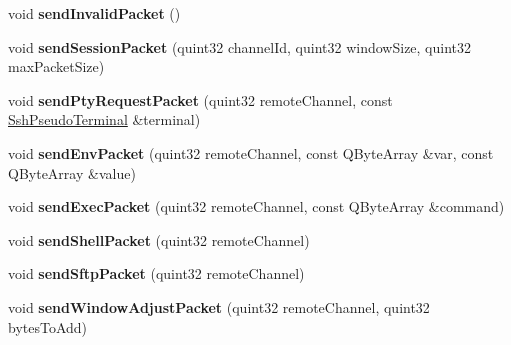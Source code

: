 \begin{DoxyCompactItemize}
\mbox{\label{class_q_ssh_1_1_internal_1_1_ssh_send_facility_a688786f9bc5702057848e1268b6a17bb}} 
void {\bfseries send\+Invalid\+Packet} ()
\item 
\mbox{\label{class_q_ssh_1_1_internal_1_1_ssh_send_facility_ac2b64dbe41fb02707c1c4c6d960437c9}} 
void {\bfseries send\+Session\+Packet} (quint32 channel\+Id, quint32 window\+Size, quint32 max\+Packet\+Size)
\item 
\mbox{\label{class_q_ssh_1_1_internal_1_1_ssh_send_facility_a0eb555c0542a5f32742dd4fc89340a75}} 
void {\bfseries send\+Pty\+Request\+Packet} (quint32 remote\+Channel, const \mbox{\hyperlink{class_q_ssh_1_1_ssh_pseudo_terminal}{Ssh\+Pseudo\+Terminal}} \&terminal)
\item 
\mbox{\label{class_q_ssh_1_1_internal_1_1_ssh_send_facility_a8f873c55cdf77a848d48255a53b7fe56}} 
void {\bfseries send\+Env\+Packet} (quint32 remote\+Channel, const Q\+Byte\+Array \&var, const Q\+Byte\+Array \&value)
\item 
\mbox{\label{class_q_ssh_1_1_internal_1_1_ssh_send_facility_ae924c7db209022b1269ab1911336e3cd}} 
void {\bfseries send\+Exec\+Packet} (quint32 remote\+Channel, const Q\+Byte\+Array \&command)
\item 
\mbox{\label{class_q_ssh_1_1_internal_1_1_ssh_send_facility_a9d964359f6fbbe32980a7571dd568aa6}} 
void {\bfseries send\+Shell\+Packet} (quint32 remote\+Channel)
\item 
\mbox{\label{class_q_ssh_1_1_internal_1_1_ssh_send_facility_a466031cd0d8368906eed1dbc57d2de65}} 
void {\bfseries send\+Sftp\+Packet} (quint32 remote\+Channel)
\item 
\mbox{\label{class_q_ssh_1_1_internal_1_1_ssh_send_facility_ace6cbcea322dace8cbb4619dc89a4404}} 
void {\bfseries send\+Window\+Adjust\+Packet} (quint32 remote\+Channel, quint32 bytes\+To\+Add)

\end{DoxyCompactItemize}
